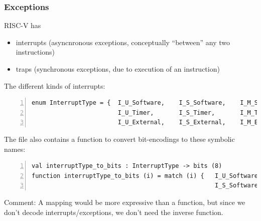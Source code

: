 \documentclass[aspectratio=169]{beamer}
\newcommand{\slidefont}{\scriptsize}
\begin{document}

\begin{frame}[fragile]
  \frametitle{Exceptions}

  \slidefont

  RISC-V has
  \begin{itemize}
  \item interrupts (asyncnronous exceptions, conceptually ``between'' any two instructions)
  \item traps (synchronous exceptions, due to execution of an instruction)
  \end{itemize}

  \vspace{1ex}

  The different kinds of interrupts:

  \vspace{1ex}

  \begin{Verbatim}[frame=single, numbers=left, label = File riscv\_types.sail]
enum InterruptType = {  I_U_Software,    I_S_Software,    I_M_Software,
                        I_U_Timer,       I_S_Timer,       I_M_Timer,
                        I_U_External,    I_S_External,    I_M_External    }
  \end{Verbatim}

  The file also contains a function to convert bit-encodings to these symbolic names:

  \vspace{1ex}

  \begin{Verbatim}[frame=single, numbers=left, label = File riscv\_types.sail]
val interruptType_to_bits : InterruptType -> bits (8)
function interruptType_to_bits (i) = match (i) {   I_U_Software => 0x00,
                                                   I_S_Software => 0x01,  ... }
  \end{Verbatim}

  Comment: A mapping would be more expressive than a function, but
  since we don't decode interrupts/exceptions, we don't need the inverse
  function.

\end{frame}

\end{document}

